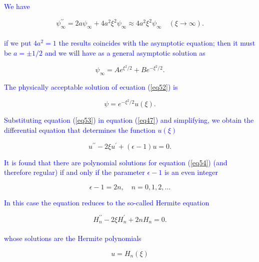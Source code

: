 \documentclass{article}
\begin{document}
\textcolor{blue}{We have}

\begin{equation}
    \psi_{\infty}^{\prime \prime}=2 a \psi_{\infty}+4 a^{2} \xi^{2} \psi_{\infty} \approx 4 a^{2} \xi^{2} \psi_{\infty} \quad(\xi \rightarrow \infty).
\end{equation}
\\
\textcolor{blue}{if we put $4a^{2} = 1$ the results coincides with the asymptotic equation; then it must be $a = \pm 1/2$ and we will have as a general asymptotic solution as}

\begin{equation}
    \psi_{\infty}=A e^{\xi^{2} / 2}+B e^{-\xi^{2} / 2}.
    \label{eq52}
\end{equation}

\textcolor{blue}{The physically acceptable solution of ecuation (\ref{eq52}) is}

\begin{equation}
    \psi=e^{-\xi^{2} / 2} u(\xi).
    \label{eq53}
\end{equation}

\textcolor{blue}{Substituting equation (\ref{eq53}) in equation (\ref{eq47}) and simplifying, we obtain the differential equation that determines the function $u(\xi)$}

\begin{equation}
    u^{\prime \prime}-2 \xi u^{\prime}+(\epsilon-1) u=0.
    \label{eq54}
\end{equation}

\textcolor{blue}{It is found that there are polynomial solutions for equation (\ref{eq54}) (and therefore regular) if and only if the parameter $\epsilon - 1$ is an even integer}

\begin{equation}
    \epsilon-1=2 n, \quad n=0,1,2, \ldots
\end{equation}

\textcolor{blue}{In this case the equation reduces to the so-called Hermite equation}

\begin{equation}
    H_{n}^{\prime \prime}-2 \xi H_{n}^{\prime}+2 n H_{n}=0.
\end{equation}
\\
\textcolor{blue}{whose solutions are the Hermite polynomials}

\begin{equation}
    u=H_{n}(\xi)
\end{equation}
\end{document}
